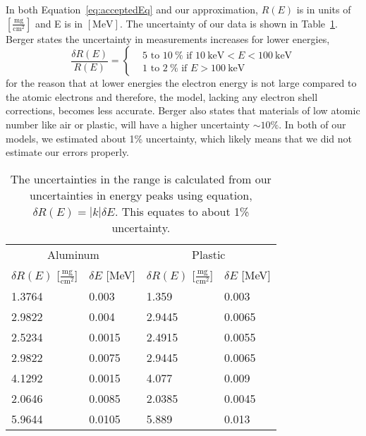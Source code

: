 In both Equation~\eqref{eq:acceptedEq} and our approximation, $R(E)$ is in units of $[\frac{\text{mg}}{\text{cm}^2}]$ and E is in $[\text{MeV}]$. The uncertainty of our data is shown in Table~\ref{tab:uncertaintyConversion}. Berger states the uncertainty in measurements increases for lower energies, 
\begin{equation}
	\frac{\delta R(E)}{R(E)} = 
	\begin{cases}
		& 5 \text{~to~} 10~\% \text{ if } 10~\text{keV}<E<100~\text{keV} \\
		& 1 \text{~to~} 2~\% \text{ if } E>100~\text{keV} 
	\end{cases}
\end{equation}
for the reason that at lower energies the electron energy is not large compared to the atomic electrons and therefore, the model, lacking any electron shell corrections, becomes less accurate. Berger also states that materials of low atomic number like air or plastic, will have a higher uncertainty $\sim 10\%$. In both of our models, we estimated about 1\% uncertainty, which likely means that we did not estimate our errors properly.
\begin{table}
	\begin{center}
		\begin{tabular}
			{llll} \toprule \multicolumn{2}{c}{Aluminum} & \multicolumn{2}{c}{Plastic}\\
			\cmidrule(r){1-2} 
			\cmidrule(r){3-4} 
			$\delta R(E)$ [$\frac{\text{mg}}{\text{cm}^2}$] & $\delta E$ [MeV] & $\delta R(E)$ [$\frac{\text{mg}}{\text{cm}^2}$] & $\delta E$ [MeV]\\
			\midrule 
			1.3764 & 0.003 	& 1.359 	& 0.003 				\\
			2.9822 & 0.004 	& 2.9445 	& 0.0065				\\
			2.5234 & 0.0015 & 2.4915 	& 0.0055				\\
			2.9822 & 0.0075 & 2.9445 	& 0.0065				\\
			4.1292 & 0.0015 & 4.077 	& 0.009					\\
			2.0646 & 0.0085 & 2.0385 	& 0.0045				\\
			5.9644 & 0.0105 & 5.889 	& 0.013					\\
			\bottomrule 
		\end{tabular}
	\end{center}
	\caption{The uncertainties in the range is calculated from our uncertainties in energy peaks using equation,\cite{093570275X} $\delta R(E) = |k| \delta E$. This equates to about 1\% uncertainty.} \label{tab:uncertaintyConversion} 
\end{table}


